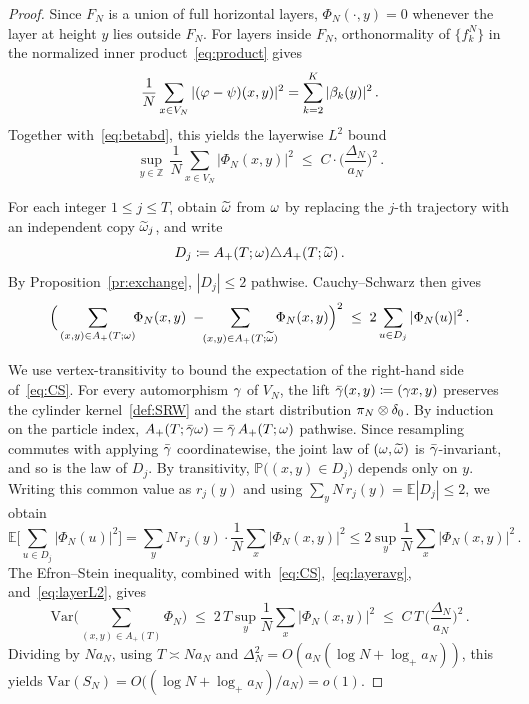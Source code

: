 \documentclass[11pt,a4paper,reqno]{amsart}
\theoremstyle{definition}
\newcommand{\bbE}{{\ensuremath{\mathbb E}} }
\newcommand{\bbP}{{\ensuremath{\mathbb P}} }
\newcommand{\bbZ}{{\ensuremath{\mathbb Z}} }
\begin{document}
\begin{proof}
Since $F_N$ is a union of full horizontal layers, $\Phi_N(\cdot, y) = 0$ whenever the layer at height $y$ lies outside $F_N$. For layers inside $F_N$, orthonormality of $\{f_k^N\}$ in the normalized inner product~\eqref{eq:product} gives
	\[ \frac{1}{N} \sum_{x \in V_N} |(\varphi - \psi)(x, y)|^2
	= \sum_{k=2}^K |\beta_k(y)|^2\,. \]
Together with~\eqref{eq:betabd}, this yields the layerwise $L^2$ bound
	\begin{equation}\label{eq:layerL2}
		\sup_{y \in \bbZ}\, \frac{1}{N} \sum_{x \in V_N} |\Phi_N(x, y)|^2
		\;\leq\; C \cdot \Big(\frac{\Delta_N}{a_N}\Big)^2\,.
	\end{equation}

For each integer $1 \leq j \leq T$, obtain $\widetilde{\omega}$ from $\omega$ by replacing the $j$-th trajectory with an independent copy $\widetilde{\omega}_j$, and write
	\[ D_j \coloneqq A_+(T;\omega) \triangle A_+(T;\widetilde{\omega})\,. \]
By Proposition~\ref{pr:exchange}, $|D_j| \leq 2$ pathwise. Cauchy--Schwarz then gives
	\begin{equation}\label{eq:CS}
	\Big( \sum_{(x,y) \in A_+(T;\omega)} \!\!\Phi_N(x,y) \;-\!\! \sum_{(x,y) \in A_+(T;\widetilde{\omega})} \!\!\Phi_N(x,y) \Big)^2
	\;\leq\; 2 \sum_{u \in D_j} |\Phi_N(u)|^2\,.
	\end{equation}

We use vertex-transitivity to bound the expectation of the right-hand side of~\eqref{eq:CS}. For every automorphism $\gamma$ of $V_N$, the lift $\bar{\gamma}(x, y) \coloneqq (\gamma x, y)$ preserves the cylinder kernel~\eqref{def:SRW} and the start distribution $\pi_N \otimes \delta_0$. By induction on the particle index, $A_+(T; \bar{\gamma} \omega) = \bar{\gamma}\, A_+(T; \omega)$ pathwise. Since resampling commutes with applying $\bar{\gamma}$ coordinatewise, the joint law of $(\omega, \widetilde{\omega})$ is $\bar{\gamma}$-invariant, and so is the law of $D_j$. By transitivity, $\bbP\bigl((x, y) \in D_j\bigr)$ depends only on $y$. Writing this common value as $r_j(y)$ and using $\sum_y N\,r_j(y) = \bbE|D_j| \leq 2$, we obtain
	\begin{equation}\label{eq:layeravg}
	 \bbE\!\bigg[ \sum_{u \in D_j} |\Phi_N(u)|^2 \bigg]
	= \sum_y N\,r_j(y) \cdot \frac{1}{N}\sum_{x} |\Phi_N(x,y)|^2
	\leq 2 \sup_y \frac{1}{N}\sum_{x} |\Phi_N(x,y)|^2\,.
	\end{equation}
The Efron--Stein inequality, combined with~\eqref{eq:CS},~\eqref{eq:layeravg}, and~\eqref{eq:layerL2}, gives
	\begin{equation}\label{eq:varSN}
	\mathrm{Var}\!\Big(\sum_{(x,y) \in A_+(T)} \Phi_N\Big)
	\;\leq\; 2\, T \sup_y \frac{1}{N}\sum_{x} |\Phi_N(x,y)|^2
	\;\leq\; C\, T\, \Big(\frac{\Delta_N}{a_N}\Big)^2\,.
	\end{equation}
Dividing by $Na_N$, using $T \asymp Na_N$ and $\Delta_N^2 = O(a_N(\log N + \log_+ a_N))$, this yields $\mathrm{Var}(S_N) = O\!\big((\log N + \log_+ a_N)/a_N\big) = o(1)$.


\end{proof}
\end{document}
